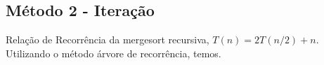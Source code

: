 \subsection{Método 2 - Iteração}
Relação de Recorrência da mergesort recursiva, $T(n) = 2T(n/2) + n$. Utilizando o método árvore de recorrência, temos.
